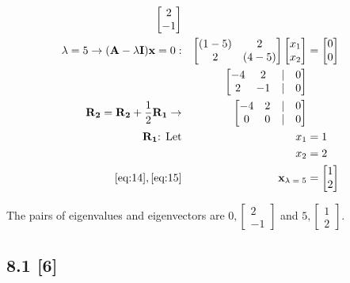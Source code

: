 \documentclass{article}
\begin{document}
\begin{align}
\begin{bmatrix}
    2\\-1
    \end{bmatrix}
    \\
    \label{eq:11}
    \lambda = 5 \rightarrow (\textbf{A} - \lambda\textbf{I})\textbf{x}=0: && \begin{bmatrix}
    (1-5) & 2\\
    2 & (4-5)
    \end{bmatrix} \begin{bmatrix}
    x_1\\x_2
    \end{bmatrix} &= \begin{bmatrix}
    0\\0
    \end{bmatrix}
    \\
    \label{eq:12}
    && \begin{bmatrix}
    -4 & 2 &|& 0\\
    2 & -1 &|& 0
    \end{bmatrix}
    \\
    \label{eq:13}
    \textbf{R\textsubscript{2}} = \textbf{R\textsubscript{2}} + \frac{1}{2}\textbf{R\textsubscript{1}} \rightarrow && \begin{bmatrix}
    -4 & 2 &|& 0\\
    0 & 0 &|& 0
    \end{bmatrix}
    \\
    \label{eq:14}
    \textbf{R\textsubscript{1}} \text{:  Let} && x_1 &= 1
    \\
    \label{eq:15}
    && x_2 &= 2
    \\
    \label{eq:16}
    \eqref{eq:14}, \eqref{eq:15} && \textbf{x\textsubscript{$\lambda=5$}} &= \begin{bmatrix}
    1\\2
    \end{bmatrix}
\end{align}

The pairs of eigenvalues and eigenvectors are $0, \begin{bmatrix} 2\\-1 \end{bmatrix}$ and $5, \begin{bmatrix} 1\\2 \end{bmatrix}$.

\subsection*{8.1 [6]}
\setcounter{equation}{0}
\end{document}

